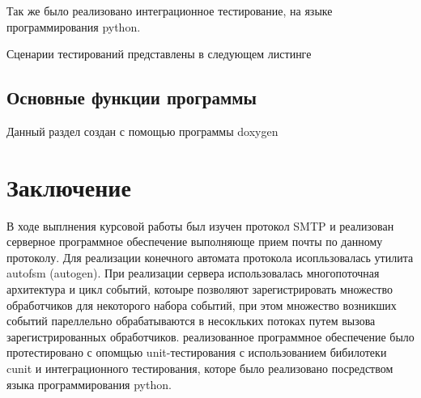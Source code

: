 \documentclass[a4paper,12pt]{report}
\begin{document}
		Так же было реализовано интеграционное тестирование, на языке программирования python.

		Сценарии тестирований представлены в следующем листинге





\section{Основные функции программы}

Данный раздел  создан с помощью программы doxygen



   



	



	\chapter*{Заключение}
	В ходе выплнения курсовой работы был изучен протокол SMTP и реализован серверное программное обеспечение выполняюще прием почты по данному протоколу. Для реализации конечного автомата протокола исопльзовалась утилита autofsm (autogen). При реализации сервера использовалась многопоточная архитектура и цикл событий, котоыре позволяют зарегистрировать множество обработчиков для некоторого набора событий, при этом множество возникших событий пареллельно обрабатываются в несокльких потоках путем вызова зарегистрированных обработчиков. реализованное программное обеспечение было протестировано с опомщью unit-тестирования с использованием бибилотеки cunit и интеграционного тестирования, которе было реализовано посредством языка программирования python.



	\printbibliography
	
	\newpage
\end{document}
